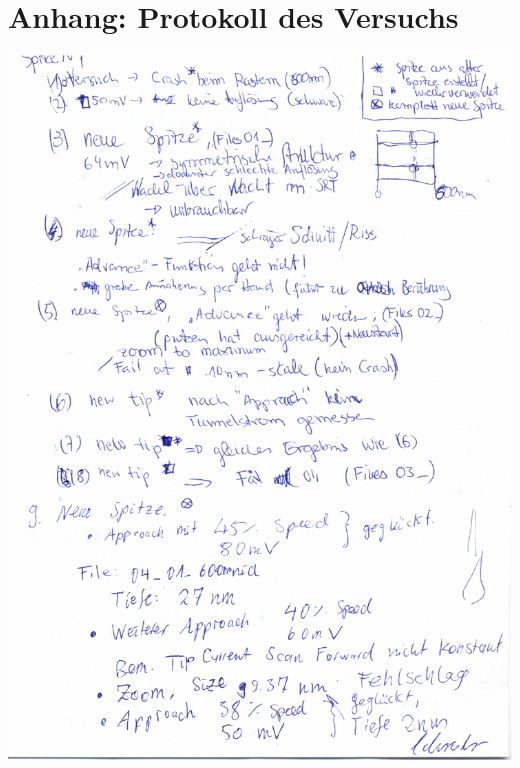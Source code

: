 \section{Anhang: Protokoll des Versuchs}
    \includegraphics[width=\linewidth]{protokoll/rtm_protokoll_01}
\clearpage
